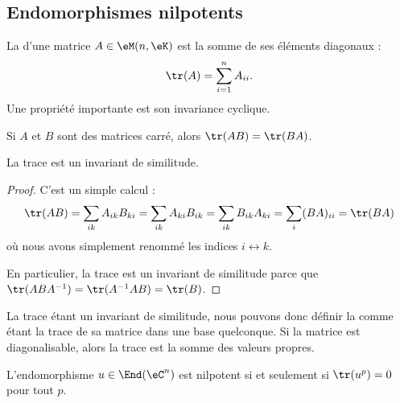 \subsection{Endomorphismes nilpotents}

La  d'une matrice \( A\in \eM(n,\eK)\) est la somme de ses éléments diagonaux :
\begin{equation}
    \tr(A)=\sum_{i=1}^nA_{ii}.
\end{equation}
Une propriété importante est son invariance cyclique.
\begin{lemma}   \label{LemhbZTay}
    Si \( A\) et \( B\) sont des matrices carré, alors \( \tr(AB)=\tr(BA)\).

    La trace est un invariant de similitude.
\end{lemma}

\begin{proof}
    C'est un simple calcul :
    \begin{equation}
            \tr(AB)=\sum_{ik}A_{ik}B_{ki}
            =\sum_{ik}A_{ki}B_{ik} 
            =\sum_{ik}B_{ik}A_{ki}
            =\sum_i(BA)_{ii}
            =\tr(BA)
    \end{equation}
    où nous avons simplement renommé les indices \( i\leftrightarrow k\).

    En particulier, la trace est un invariant de similitude parce que \( \tr(ABA^{-1})=\tr(A^{-1} AB)=\tr(B)\). 
\end{proof}
La trace étant un invariant de similitude, nous pouvons donc définir la  comme étant la trace de sa matrice dans une base quelconque. Si la matrice est diagonalisable, alors la trace est la somme des valeurs propres.

\begin{lemma}   \label{LemzgNOjY}
    L'endomorphisme \( u\in\End(\eC^n)\) est nilpotent si et seulement si \( \tr(u^p)=0\) pour tout \( p\).
\end{lemma}

